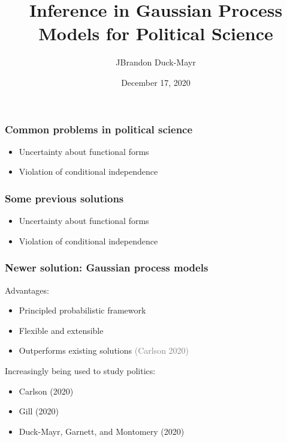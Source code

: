 \documentclass{beamer}
\title[Inference in GP Models]{Inference in Gaussian Process Models for Political Science}
\author[Duck-Mayr]{JBrandon Duck-Mayr}
\date{December 17, 2020}
\begin{document}
\begin{frame}
    \titlepage
\end{frame}

\begin{frame}
    \frametitle{Common problems in political science}
    \pause
    \begin{itemize}[<+->]
        \item Uncertainty about functional forms
        \item Violation of conditional independence
    \end{itemize}
\end{frame}

\begin{frame}
    \frametitle{Some previous solutions}
    \begin{itemize}
        \item Uncertainty about functional forms
        \item Violation of conditional independence
    \end{itemize}
\end{frame}

\begin{frame}
    \frametitle{Newer solution: Gaussian process models}
    \pause
    Advantages:
    \begin{itemize}
        \item Principled probabilistic framework
        \item Flexible and extensible
        \item Outperforms existing solutions {\footnotesize\textcolor{gray}{(Carlson 2020)}} 
    \end{itemize}
    \pause
    Increasingly being used to study politics:
    \begin{itemize}
        \item Carlson (2020)
        \item Gill (2020)
        \item Duck-Mayr, Garnett, and Montomery (2020)
    \end{itemize}
\end{frame}
\end{document}
